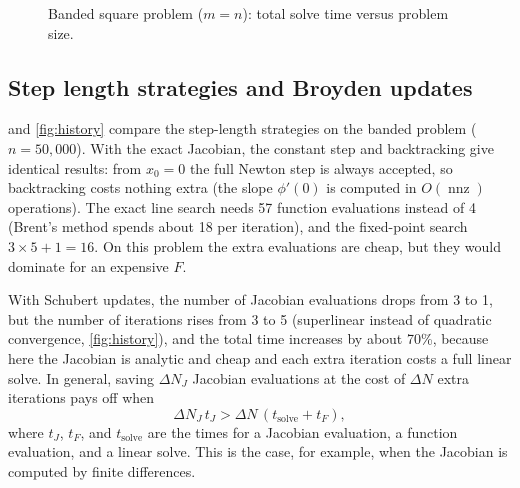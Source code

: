 \documentclass[11pt]{article}
\DeclareMathOperator{\nnz}{nnz}
\begin{document}
\begin{figure}[htbp]
\centering
{}
\caption{Banded square problem ($m = n$): total solve time versus problem size.}
\label{fig:square}
\end{figure}

\subsection{Step length strategies and Broyden updates}
\label{sec:exp-steps}
 and \cref{fig:history} compare the step-length strategies on the banded problem
($n = 50{,}000$). With the exact Jacobian, the constant step and backtracking give identical results:
from $x_0 = 0$ the full Newton step is always accepted, so backtracking costs nothing extra (the slope
$\phi'(0)$ is computed in $O(\nnz)$ operations). The exact line search needs 57 function evaluations
instead of 4 (Brent's method spends about 18 per iteration), and the fixed-point search $3 \times 5 + 1 = 16$.
On this problem the extra evaluations are cheap, but they would dominate for an expensive $F$.

With Schubert updates, the number of Jacobian evaluations drops from 3 to 1, but the number of
iterations rises from 3 to 5 (superlinear instead of quadratic convergence, \cref{fig:history}), and
the total time increases by about 70\%, because here the Jacobian is analytic and cheap and each extra
iteration costs a full linear solve. In general, saving $\Delta N_J$ Jacobian evaluations at the cost of
$\Delta N$ extra iterations pays off when
\begin{equation}
  \Delta N_J\, t_J > \Delta N\, (t_{\text{solve}} + t_F) ,
\end{equation}
where $t_J$, $t_F$, and $t_{\text{solve}}$ are the times for a Jacobian evaluation, a function evaluation, and a
linear solve. This is the case, for example, when the Jacobian is computed by finite differences.
\end{document}
